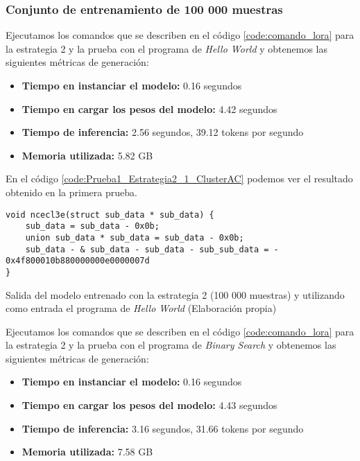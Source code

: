 \subsubsection{Conjunto de entrenamiento de 100 000 muestras}

Ejecutamos los comandos que se describen en el código \ref{code:comando_lora} para
la estrategia 2 y la prueba con el programa de \textit{Hello World} y obtenemos
las siguientes métricas de generación:

\begin{itemize}
    \item \textbf{Tiempo en instanciar el modelo:} 0.16 segundos
    \item \textbf{Tiempo en cargar los pesos del modelo:} 4.42 segundos
    \item \textbf{Tiempo de inferencia:} 2.56 segundos, 39.12 tokens por segundo
    \item \textbf{Memoria utilizada:} 5.82 GB
\end{itemize}

En el código \ref{code:Prueba1_Estrategia2_1_ClusterAC} podemos ver el resultado obtenido
en la primera prueba.

\begin{mycode}
    \begin{verbatim}
void ncecl3e(struct sub_data * sub_data) { 
    sub_data = sub_data - 0x0b; 
    union sub_data * sub_data = sub_data - 0x0b; 
    sub_data - & sub_data - sub_data - sub_sub_data = - 0x4f800010b880000000e0000007d
}
    \end{verbatim}
    \caption[Salida del modelo entrenado con la estrategia 2 (100 000 muestras) y utilizando como entrada el programa de \textit{Hello World}]{Salida del modelo entrenado con la estrategia 2 (100 000 muestras) y utilizando como entrada el programa de \textit{Hello World} (Elaboración propia)}
    \label{code:Prueba1_Estrategia2_1_ClusterAC}
\end{mycode}

Ejecutamos los comandos que se describen en el código \ref{code:comando_lora} para
la estrategia 2 y la prueba con el programa de \textit{Binary Search} y obtenemos
las siguientes métricas de generación:

\begin{itemize}
    \item \textbf{Tiempo en instanciar el modelo:} 0.16 segundos
    \item \textbf{Tiempo en cargar los pesos del modelo:} 4.43 segundos
    \item \textbf{Tiempo de inferencia:} 3.16 segundos, 31.66 tokens por segundo
    \item \textbf{Memoria utilizada:} 7.58 GB
\end{itemize}

